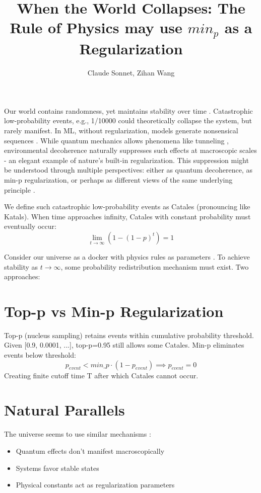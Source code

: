 \documentclass{article}
\title{When the World Collapses: The Rule of Physics may use $min_p$ as a Regularization}
\author{Claude Sonnet, Zihan Wang}
\begin{document}
\maketitle
Our world contains randomness, yet maintains stability over time \cite{prigogine1984order, anderson1972more}. Catastrophic low-probability events, e.g., 1/10000 could theoretically collapse the system, but rarely manifest. In ML, without regularization, models generate nonsensical sequences \cite{holtzman2019curious}. While quantum mechanics allows phenomena like tunneling \cite{razavy2003quantum}, environmental decoherence naturally suppresses such effects at macroscopic scales - an elegant example of nature's built-in regularization. This suppression might be understood through multiple perspectives: either as quantum decoherence, as min-p regularization, or perhaps as different views of the same underlying principle \cite{barrow1988anthropic}.


We define such catastrophic low-probability events as Catales (pronouncing like Katals). When time approaches infinity, Catales with constant probability must eventually occur:
\[
\lim_{t \to \infty} (1 - (1-p)^t) = 1
\]

Consider our universe as a docker with physics rules as parameters \cite{carter1974large}. To achieve stability as $t\to\infty$, some probability redistribution mechanism must exist. Two approaches:

\section{Top-p vs Min-p Regularization}
Top-p (nucleus sampling) \cite{holtzman2019curious} retains events within cumulative probability threshold. Given [0.9, 0.0001, ...], top-p=0.95 still allows some Catales.
Min-p \cite{nguyen2024turningheat} eliminates events below threshold:
\[
p_{event} < min\_p \cdot (1-p_{event}) \implies p_{event} = 0
\]
Creating finite cutoff time T after which Catales cannot occur.

\section{Natural Parallels}
The universe seems to use similar mechanisms \cite{prigogine1984order}:
\begin{itemize}
    \item Quantum effects don't manifest macroscopically \cite{griffiths2018introduction}
    \item Systems favor stable states
    \item Physical constants act as regularization parameters \cite{barrow1988anthropic}
\end{itemize}
\end{document}
